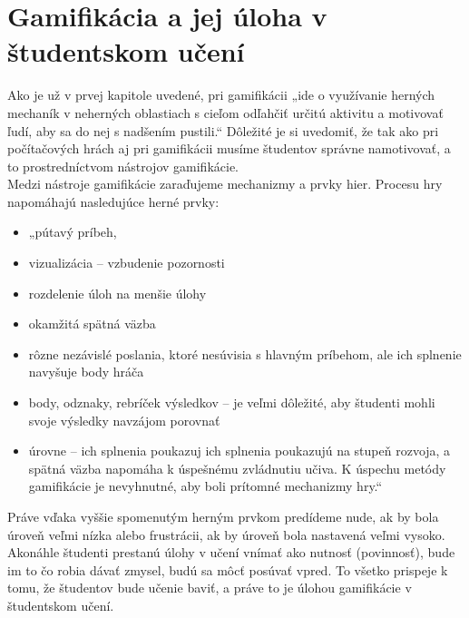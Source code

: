 \documentclass[10pt,slovak,a4paper]{article}
\begin{document}
\section{Gamifikácia a jej úloha v študentskom učení }
\label{dolezitejsia} 
\noindent
\hspace*{1.5em}
Ako je už v prvej kapitole uvedené, pri gamifikácii „ide o využívanie herných mechaník v neherných oblastiach s cieľom odľahčiť určitú aktivitu a motivovať ľudí, aby sa do nej s nadšením pustili.“  Dôležité je si uvedomiť, že tak ako pri počítačových hrách aj pri gamifikácii musíme študentov správne namotivovať, a to prostredníctvom nástrojov gamifikácie.\\ 
\indent Medzi nástroje gamifikácie zaraďujeme mechanizmy a prvky hier. Procesu hry napomáhajú nasledujúce herné prvky:
\begin{itemize}
\item „pútavý príbeh,
\item vizualizácia – vzbudenie pozornosti
\item rozdelenie úloh na menšie úlohy
\item okamžitá spätná väzba
\item 	rôzne nezávislé poslania, ktoré nesúvisia s hlavným príbehom, ale ich splnenie navyšuje body hráča
\item 	body, odznaky, rebríček výsledkov – je veľmi dôležité, aby študenti mohli svoje výsledky navzájom porovnať
\item úrovne – ich splnenia poukazuj ich splnenia poukazujú na stupeň rozvoja, a spätná väzba napomáha k úspešnému zvládnutiu učiva. K úspechu metódy gamifikácie je nevyhnutné, aby boli prítomné mechanizmy hry.“
\cite{cite8}

\end{itemize}
\noindent
\hspace*{1.5em} Práve vďaka vyššie spomenutým herným prvkom predídeme nude, ak by bola úroveň veľmi nízka alebo frustrácii, ak by úroveň bola nastavená veľmi vysoko. Akonáhle študenti prestanú úlohy v učení vnímať ako nutnosť (povinnosť), bude im to čo robia dávať zmysel, budú sa môcť posúvať vpred. To všetko prispeje k tomu, že študentov bude učenie baviť, a práve to je úlohou gamifikácie v študentskom učení.\\
\end{document}
